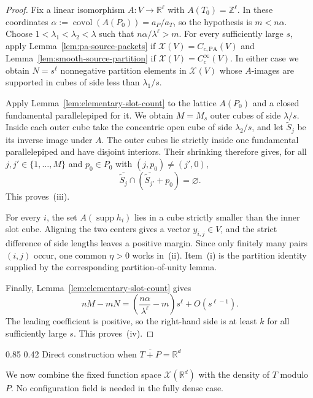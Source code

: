 \documentclass[11pt,reqno]{amsart}
\makeatletter
\numberwithin{equation}{section}
\renewcommand\subsection{\@startsection{subsection}{2}{\z@}%
  {0.85\baselineskip \@plus 0.25\baselineskip \@minus 0.10\baselineskip}%
  {0.42\baselineskip}%
  {\normalfont\bfseries}}
\theoremstyle{definition}
\theoremstyle{remark}
\newcommand{\R}{\mathbb R}
\newcommand{\Z}{\mathbb Z}
\newcommand{\covol}{\operatorname{covol}}
\newcommand{\supp}{\operatorname{supp}}
\makeatother
\begin{document}
\begin{proof}
Fix a linear isomorphism $A:V\to\R^\ell$ with
$A(T_0)=\Z^\ell$.  In these coordinates $\alpha:=\covol(A(P_0))=a_P/a_T$, so the hypothesis is $m<n\alpha$.  Choose $1<\lambda_1<\lambda_2<\lambda$ such that $n\alpha/\lambda^\ell>m$.
For every sufficiently large $s$, apply
Lemma~\ref{lem:pa-source-packets} if
$\mathcal X(V)=C_{c,\mathrm{PA}}(V)$ and
Lemma~\ref{lem:smooth-source-partition} if
$\mathcal X(V)=C_c^\infty(V)$.  In either case we obtain
$N=s^\ell$ nonnegative partition elements in $\mathcal X(V)$ whose
$A$-images are supported in cubes of side less than $\lambda_1/s$.

Apply Lemma~\ref{lem:elementary-slot-count} to the lattice $A(P_0)$ and a
closed fundamental parallelepiped for it.  We obtain $M=M_s$ outer cubes of
side $\lambda/s$.  Inside each outer cube take the concentric open cube of
side $\lambda_2/s$, and let $\widetilde S_j$ be its inverse image under
$A$.  The outer cubes lie strictly inside one fundamental parallelepiped and
have disjoint interiors.  Their shrinking therefore gives, for all
$j,j'\in\{1,\ldots,M\}$ and $p_0\in P_0$ with
$(j,p_0)\ne(j',0)$,
\[
 \overline{\widetilde S_j}\cap
 (\overline{\widetilde S_{j'}}+p_0)=\varnothing.
\]
This proves~(iii).

For every $i$, the set $A(\supp h_i)$ lies in a cube strictly smaller than the inner
slot cube.  Aligning the two centers gives a vector $y_{i,j}\in V$, and the
strict difference of side lengths leaves a positive margin.  Since only
finitely many pairs $(i,j)$ occur, one common $\eta>0$ works in~(ii).
Item~(i) is the partition identity supplied by the corresponding
partition-of-unity lemma.

Finally, Lemma~\ref{lem:elementary-slot-count} gives
\[
 nM-mN
 =\left(\frac{n\alpha}{\lambda^\ell}-m\right)s^\ell
   +O(s^{\ell-1}).
\]
The leading coefficient is positive, so the right-hand side is at least
$k$ for all sufficiently large $s$.  This proves~(iv).
\end{proof}

\subsection{Direct construction when $\overline{T+P}=\R^d$}

We now combine the fixed function space $\mathcal X(\R^d)$ with the density of $T$ modulo
$P$.  No configuration field is needed in the fully dense case.
\end{document}
